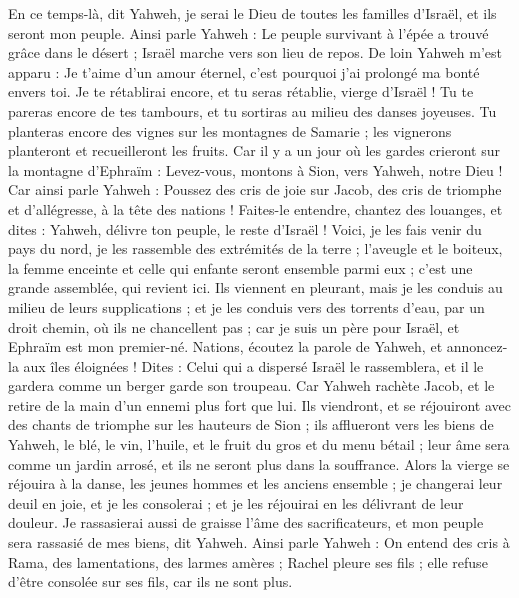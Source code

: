 \begin{multicols}{2}
\VerseOne{}En ce temps-là, dit Yahweh, je serai le Dieu de toutes les familles d'Israël, et ils seront mon peuple.
Ainsi parle Yahweh : Le peuple survivant à l'épée a trouvé grâce dans le désert ; Israël marche vers son lieu de repos.
De loin Yahweh m'est apparu : Je t'aime d'un amour éternel, c'est pourquoi j'ai prolongé ma bonté envers toi.
Je te rétablirai encore, et tu seras rétablie, vierge d'Israël ! Tu te pareras encore de tes tambours, et tu sortiras au milieu des danses joyeuses.
Tu planteras encore des vignes sur les montagnes de Samarie ; les vignerons planteront et recueilleront les fruits.
Car il y a un jour où les gardes crieront sur la montagne d'Ephraïm : Levez-vous, montons à Sion, vers Yahweh, notre Dieu !
Car ainsi parle Yahweh : Poussez des cris de joie sur Jacob, des cris de triomphe et d'allégresse, à la tête des nations ! Faites-le entendre, chantez des louanges, et dites : Yahweh, délivre ton peuple, le reste d'Israël !
Voici, je les fais venir du pays du nord, je les rassemble des extrémités de la terre ; l'aveugle et le boiteux, la femme enceinte et celle qui enfante seront ensemble parmi eux ; c'est une grande assemblée, qui revient ici.
Ils viennent en pleurant, mais je les conduis au milieu de leurs supplications ; et je les conduis vers des torrents d'eau, par un droit chemin, où ils ne chancellent pas ; car je suis un père pour Israël, et Ephraïm est mon premier-né.
Nations, écoutez la parole de Yahweh, et annoncez-la aux îles éloignées ! Dites : Celui qui a dispersé Israël le rassemblera, et il le gardera comme un berger garde son troupeau.
Car Yahweh rachète Jacob, et le retire de la main d'un ennemi plus fort que lui.
Ils viendront, et se réjouiront avec des chants de triomphe sur les hauteurs de Sion ; ils afflueront vers les biens de Yahweh, le blé, le vin, l'huile, et le fruit du gros et du menu bétail ; leur âme sera comme un jardin arrosé, et ils ne seront plus dans la souffrance.
Alors la vierge se réjouira à la danse, les jeunes hommes et les anciens ensemble ; je changerai leur deuil en joie, et je les consolerai ; et je les réjouirai en les délivrant de leur douleur.
Je rassasierai aussi de graisse l'âme des sacrificateurs, et mon peuple sera rassasié de mes biens, dit Yahweh.
Ainsi parle Yahweh : On entend des cris à Rama, des lamentations, des larmes amères ; Rachel pleure ses fils ; elle refuse d'être consolée sur ses fils, car ils ne sont plus.

\end{multicols}
